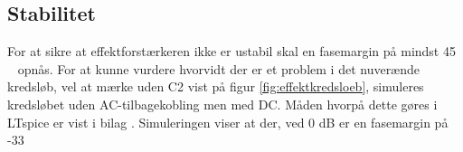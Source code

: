 \subsection{Stabilitet}
\label{effektforstaerker-stabilitet}

For at sikre at effektforstærkeren ikke er ustabil skal en fasemargin på mindst 45 \degree~ opnås. For at kunne vurdere hvorvidt der er et problem i det nuverænde kredsløb, vel at mærke uden C2 vist på figur \ref{fig:effektkredsloeb}, simuleres kredsløbet uden AC-tilbagekobling men med DC. Måden hvorpå dette gøres i LTspice er vist i bilag . Simuleringen viser at der, ved 0 dB er en fasemargin på -33 \degree~